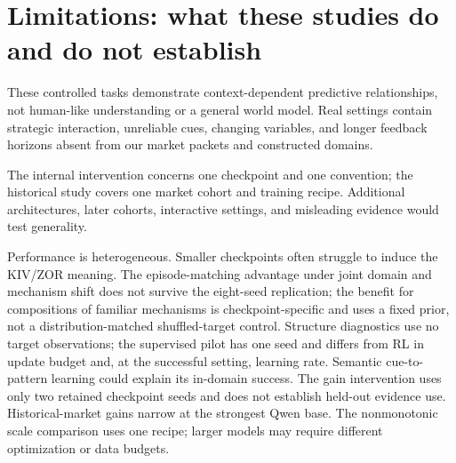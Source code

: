 \section{Limitations: what these studies do and do not establish}
\label{sec:limitations}

These controlled tasks demonstrate context-dependent predictive relationships,
not human-like understanding or a general world model. Real settings contain
strategic interaction, unreliable cues, changing variables, and longer feedback
horizons absent from our market packets and constructed domains.

The internal intervention concerns one checkpoint and one convention; the
historical study covers one market cohort and training recipe. Additional
architectures, later cohorts, interactive settings, and misleading evidence
would test generality.

Performance is heterogeneous. Smaller checkpoints often struggle to induce the
KIV/ZOR meaning. The episode-matching advantage under joint domain and mechanism
shift does not survive the eight-seed replication; the benefit for compositions
of familiar mechanisms is checkpoint-specific and uses a fixed prior, not a
distribution-matched shuffled-target control. Structure diagnostics use no target
observations; the supervised pilot has one seed and differs from RL in update
budget and, at the successful setting, learning rate. Semantic cue-to-pattern
learning could explain its in-domain success. The gain intervention uses only
two retained checkpoint seeds and does not establish held-out evidence use.
Historical-market gains narrow at the strongest Qwen base. The nonmonotonic
scale comparison uses one recipe; larger models may require different
optimization or data budgets.
